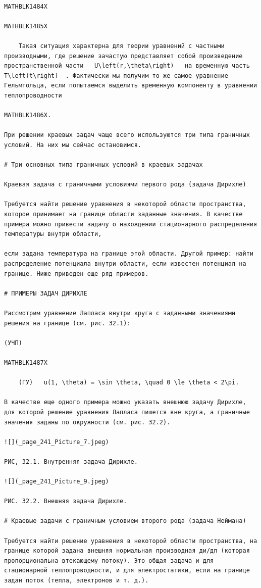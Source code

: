 \documentclass[
]{article}
\begin{document}
\begin{verbatim}

MATHBLK1484X

MATHBLK1485X

    Такая ситуация характерна для теории уравнений с частными производными, где решение зачастую представляет собой произведение пространственной части   U\left(r,\theta\right)   на временную часть   T\left(t\right)  . Фактически мы получим то же самое уравнение Гельмгольца, если попытаемся выделить временную компоненту в уравнении теплопроводности

MATHBLK1486X.

При решении краевых задач чаще всего используются три типа граничных условий. На них мы сейчас остановимся.

# Три основных типа граничных условий в краевых задачах

Краевая задача с граничными условиями первого рода (задача Дирихле)

Требуется найти решение уравнения в некоторой области пространства, которое принимает на границе области заданные значения. В качестве примера можно привести задачу о нахождении стационарного распределения температуры внутри области,

если задана температура на границе этой области. Другой пример: найти распределение потенциала внутри области, если известен потенциал на границе. Ниже приведен еще ряд примеров.

# ПРИМЕРЫ ЗАДАЧ ДИРИХЛЕ

Рассмотрим уравнение Лапласа внутри круга с заданными значениями решения на границе (см. рис. 32.1):

(УЧП)

MATHBLK1487X

    (ГУ)   u(1, \theta) = \sin \theta, \quad 0 \le \theta < 2\pi. 

В качестве еще одного примера можно указать внешнюю задачу Дирихле, для которой решение уравнения Лапласа пишется вне круга, а граничные значения заданы по окружности (см. рис. 32.2).

![](_page_241_Picture_7.jpeg)

РИС, 32.1. Внутренняя задача Дирихле.

![](_page_241_Picture_9.jpeg)

РИС. 32.2. Внешняя задача Дирихле.

# Краевые задачи с граничным условием второго рода (задача Неймана)

Требуется найти решение уравнения в некоторой области пространства, на границе которой задана внешняя нормальная производная ди/дп (которая пропорциональна втекающему потоку). Это общая задача и для стационарной теплопроводности, и для электростатики, если на границе задан поток (тепла, электронов и т. д.).


\end{verbatim}
\end{document}
